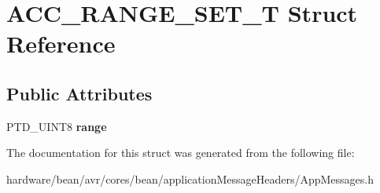 \hypertarget{struct_a_c_c___r_a_n_g_e___s_e_t___t}{}\section{A\+C\+C\+\_\+\+R\+A\+N\+G\+E\+\_\+\+S\+E\+T\+\_\+T Struct Reference}
\label{struct_a_c_c___r_a_n_g_e___s_e_t___t}
\subsection*{Public Attributes}
\begin{DoxyCompactItemize}
\item 
P\+T\+D\+\_\+\+U\+I\+N\+T8 {\bfseries range}\hypertarget{struct_a_c_c___r_a_n_g_e___s_e_t___t_a25ad520026f90860ce7d04f30145c742}{}\label{struct_a_c_c___r_a_n_g_e___s_e_t___t_a25ad520026f90860ce7d04f30145c742}

\end{DoxyCompactItemize}


The documentation for this struct was generated from the following file\+:\begin{DoxyCompactItemize}
\item 
hardware/bean/avr/cores/bean/application\+Message\+Headers/App\+Messages.\+h\end{DoxyCompactItemize}
